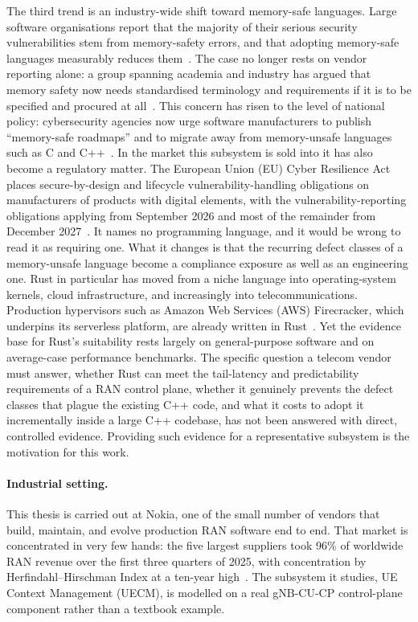 \documentclass[english,oneside,a4paper,censored,csm,software-track-2020]{HYthesisML}
\begin{document}
The third trend is an industry-wide shift toward memory-safe languages. Large
software organisations report that the majority of their serious security vulnerabilities
stem from memory-safety errors, and that adopting memory-safe languages measurably reduces
them~\cite{msrc2019memory,google2022android,vanderstoep2025android,google2024securebydesign}.
The case no longer rests on vendor reporting alone: a group spanning academia and industry has
argued that memory safety now needs standardised terminology and requirements if it is to be
specified and procured at all~\cite{watson2025memorysafety}. This concern has risen to the level of national
policy: cybersecurity agencies now urge software manufacturers to publish ``memory-safe
roadmaps'' and to migrate away from memory-unsafe languages such as C and
C++~\cite{cisa2023memorysafe,oncd2024building}. In the market this subsystem is sold into it has
also become a regulatory matter. The European Union (EU) Cyber Resilience Act places secure-by-design and
lifecycle vulnerability-handling obligations on manufacturers of products with digital elements,
with the vulnerability-reporting obligations applying from September 2026 and most of the
remainder from December 2027~\cite{eu2024cra}. It names no programming language, and it would be wrong to read it as
requiring one. What it changes is that the recurring defect classes of a memory-unsafe language
become a compliance exposure as well as an engineering one. Rust in particular has moved from a niche
language into operating-system kernels, cloud infrastructure, and increasingly into
telecommunications. Production hypervisors such as Amazon Web Services (AWS) Firecracker, which underpins its
serverless platform, are already written in Rust~\cite{agache2020firecracker}. Yet the evidence base for Rust's suitability rests largely on
general-purpose software and on average-case performance benchmarks. The specific question a
telecom vendor must answer, whether Rust can meet the tail-latency and predictability
requirements of a RAN control plane, whether it genuinely prevents the defect classes that
plague the existing C++ code, and what it costs to adopt it incrementally inside a large C++
codebase, has not been answered with direct, controlled evidence. Providing such evidence
for a representative subsystem is the motivation for this work.

\paragraph{Industrial setting.}
This thesis is carried out at Nokia, one of the small number of vendors that build, maintain,
and evolve production RAN software end to end. That market is concentrated in very few hands:
the five largest suppliers took 96\% of worldwide RAN revenue over the first three quarters of
2025, with concentration by Herfindahl--Hirschman Index at a ten-year
high~\cite{delloro2025ran3q,delloro2026ran}. The subsystem it studies, UE Context
Management (UECM), is modelled on a real gNB-CU-CP control-plane component rather than a
textbook example.
\end{document}
